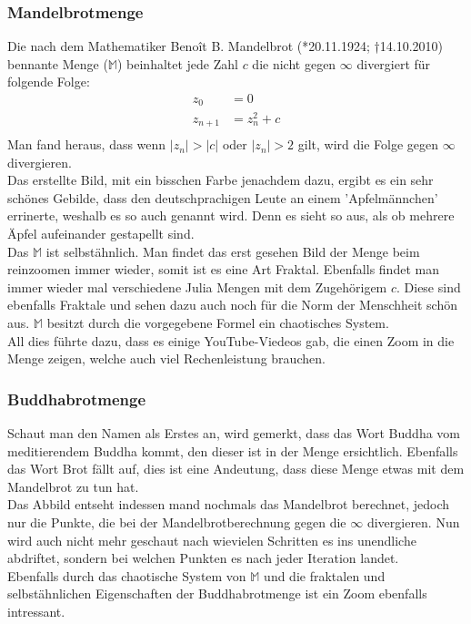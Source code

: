 \subsubsection{Mandelbrotmenge}
Die nach dem Mathematiker Benoît B. Mandelbrot (*20.11.1924; †14.10.2010) bennante Menge ($\mathbb{M}$) beinhaltet jede Zahl $c$ die nicht gegen $\infty$ divergiert für folgende Folge:
\begin{align*}
z_0&=0\\
z_{n+1}&=z^2_n+c\\
\end{align*}
Man fand heraus, dass wenn $|z_n|>|c|$ oder $|z_n| > 2$ gilt, wird die Folge gegen $\infty$ divergieren.\\
Das erstellte Bild, mit ein bisschen Farbe jenachdem dazu, ergibt es ein sehr schönes Gebilde, dass den deutschprachigen Leute an einem 'Apfelmännchen' errinerte, weshalb es so auch genannt wird. Denn es sieht so aus, als ob mehrere Äpfel aufeinander gestapellt sind.\\
Das $\mathbb{M}$ ist selbstähnlich. Man findet das erst gesehen Bild der Menge beim reinzoomen immer wieder, somit ist es eine Art Fraktal. Ebenfalls findet man immer wieder mal verschiedene Julia Mengen mit dem Zugehörigem $c$. Diese sind ebenfalls Fraktale und sehen dazu auch noch für die Norm der Menschheit schön aus. $\mathbb{M}$ besitzt durch die vorgegebene Formel ein chaotisches System.\\
All dies führte dazu, dass es einige YouTube-Viedeos gab, die einen Zoom in die Menge zeigen, welche auch viel Rechenleistung brauchen.
\subsubsection{Buddhabrotmenge}
Schaut man den Namen als Erstes an, wird gemerkt, dass das Wort Buddha vom meditierendem Buddha kommt, den dieser ist in der Menge ersichtlich. Ebenfalls das Wort Brot fällt auf, dies ist eine Andeutung, dass diese Menge etwas mit dem Mandelbrot zu tun hat. \\ Das Abbild entseht indessen mand nochmals das Mandelbrot berechnet, jedoch nur die Punkte, die bei der Mandelbrotberechnung gegen die $\infty$ divergieren. Nun wird auch nicht mehr geschaut nach wievielen Schritten es ins unendliche abdriftet, sondern bei welchen Punkten es nach jeder Iteration landet.\\
Ebenfalls durch das chaotische System von $\mathbb{M}$ und die fraktalen und selbstähnlichen Eigenschaften der Buddhabrotmenge ist ein Zoom ebenfalls intressant.